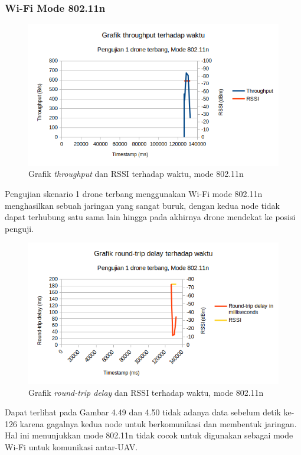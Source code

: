 \subsubsection{Wi-Fi Mode 802.11n}
\begin{figure}[H]
	\centering
	\includegraphics[scale=0.7]{./assets/Graphs/1Fly_11N/Throughput-Time}
	\caption{Grafik \textit{throughput} dan RSSI terhadap waktu, mode 802.11n}
\end{figure}
Pengujian skenario 1 drone terbang menggunakan Wi-Fi mode 802.11n menghasilkan sebuah jaringan yang sangat buruk, dengan kedua node tidak dapat terhubung satu sama lain hingga pada akhirnya drone mendekat ke posisi penguji.
\begin{figure}[H]
	\centering
	\includegraphics[scale=0.7]{./assets/Graphs/1Fly_11N/Delay-Time}
	\caption{Grafik \textit{round-trip delay} dan RSSI terhadap waktu, mode 802.11n}
\end{figure}
Dapat terlihat pada Gambar 4.49 dan 4.50 tidak adanya data sebelum detik ke-126 karena gagalnya kedua node untuk berkomunikasi dan membentuk jaringan. Hal ini menunjukkan mode 802.11n tidak cocok untuk digunakan sebagai mode Wi-Fi untuk komunikasi antar-UAV.

